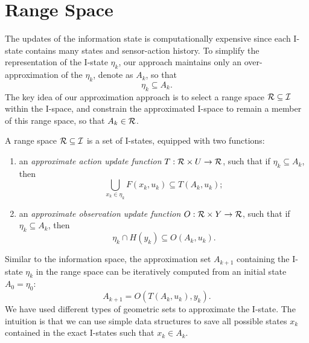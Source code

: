\section{Range Space}
\label{sec:rspace}
The updates of the information state is computationally expensive since each
I-state contains many states and sensor-action history. 
%
To simplify the representation of the I-state $\eta_k$, our approach maintains only an
over-approximation of the $\eta_k$, denote as $A_k$, so that
\begin{equation}
  \eta_k \subseteq A_k.
\end{equation}
%
The key idea of our approximation approach is to select a range space $\mathcal{R}
\subseteq \mathcal{I}$ within the I-space, and constrain the approximated I-space to
remain a member of this range space, so that $A_k \in \mathcal{R}$.
\begin{defn}
  \label{def:rspace}
  A range space $\mathcal{R} \subseteq \mathcal{I}$ is a set of I-states, equipped with
  two functions:
  \begin{enumerate}
  \item an \emph{approximate action update function} $T: \mathcal{R} \times U \to
    \mathcal{R}$, such that if $\eta_k \subseteq A_k$, then
    \begin{equation}
      \label{eq:T}
      \bigcup_{x_k \in \eta_k} F(x_k, u_k) \subseteq T(A_k, u_k);
    \end{equation}
  \item an \emph{approximate observation update function} $O: \mathcal{R} \times
    Y \to \mathcal{R}$, such that if $\eta_k \subseteq A_k$, then
    \begin{equation}
      \label{eq:O}
      \eta_k \cap H(y_k) \subseteq O(A_k, u_k).
    \end{equation}
  \end{enumerate}
\end{defn}
%
Similar to the information space, the approximation set $A_{k+1}$ containing the
I-state $\eta_k$ in the range space can be iteratively computed from an initial
state $A_0 = \eta_0$:
\begin{equation}
  A_{k+1} = O(T(A_k, u_k), y_{k}).
\end{equation}
%
We have used different types of geometric sets to approximate the I-state. 
%
The intuition is that we can use simple data structures to save all possible states
$x_k$ contained in the exact I-states such that $x_k \in A_k$.

